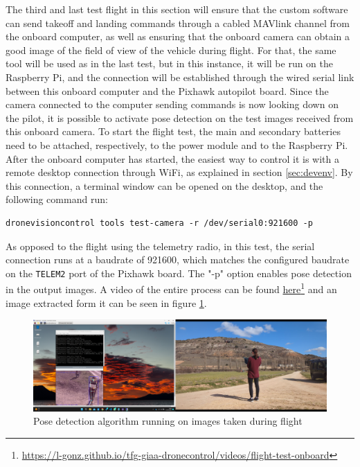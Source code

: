 The third and last test flight in this section will ensure that the custom software can send takeoff and landing commands through a cabled MAVlink channel from the onboard computer,
as well as ensuring that the onboard camera can obtain a good image of the field of view of the vehicle during flight.
For that, the same tool will be used as in the last test, 
but in this instance, it will be run on the Raspberry Pi, and the connection will be established through the wired serial link between this onboard computer and the Pixhawk autopilot board.
Since the camera connected to the computer sending commands is now looking down on the pilot, it is possible to activate pose detection on the test images received from this onboard camera.
To start the flight test, the main and secondary batteries need to be attached, respectively, to the power module and to the Raspberry Pi.
After the onboard computer has started, the easiest way to control it is with a remote desktop connection through WiFi, as explained in section \ref{sec:devenv}.
By this connection, a terminal window can be opened on the desktop, and the following command run:
\begin{verbatim}
dronevisioncontrol tools test-camera -r /dev/serial0:921600 -p
\end{verbatim}
As opposed to the flight using the telemetry radio, in this test, the serial connection runs at a baudrate of 921600, which matches the configured baudrate on the \texttt{TELEM2} port of the Pixhawk board.
The "-p" option enables pose detection in the output images.
A video of the entire process can be found \href{https://l-gonz.github.io/tfg-giaa-dronecontrol/videos/flight-test-onboard}{here}\footnote{\url{https://l-gonz.github.io/tfg-giaa-dronecontrol/videos/flight-test-onboard}} and an image extracted form it can be seen in figure \ref{fig:flight-test-cam-onboard}.


\begin{figure}
  \centering
  \includegraphics[width=\textwidth, keepaspectratio]{img/video-field-test-onboard.png}
  \caption{Pose detection algorithm running on images taken during flight}
  \label{fig:flight-test-cam-onboard}
\end{figure}


